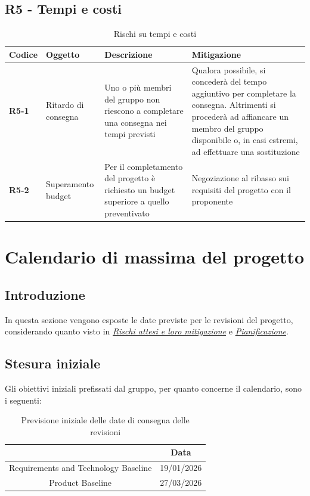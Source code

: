 \documentclass[a4paper,12pt]{article}
\begin{document}
    \subsection{R5 - Tempi e costi}
        \begin{table}[H]
        \label{tab:r5}
            \begin{tabularx}{\textwidth}{|l|L|L|L|}
            \hline
            \textbf{Codice} & \textbf{Oggetto} & \textbf{Descrizione} & \textbf{Mitigazione}\\
            \hline
            \textbf{R5-1} & Ritardo di consegna & Uno o più membri del gruppo non riescono a completare una consegna nei tempi previsti & Qualora possibile, si concederà del tempo aggiuntivo per completare la consegna. Altrimenti si procederà ad affiancare un membro del gruppo disponibile o, in casi estremi, ad effettuare una sostituzione\\
            \hline
            \textbf{R5-2} & Superamento budget & Per il completamento del progetto è richiesto un budget superiore a quello preventivato & Negoziazione al ribasso sui requisiti del progetto con il proponente \\
            \hline
            \end{tabularx}
            \caption{Rischi su tempi e costi}
        \end{table}

\newpage
\section{Calendario di massima del progetto}
    \subsection{Introduzione}
        In questa sezione vengono esposte le date previste per le revisioni del progetto, considerando quanto visto in \href{sec:rischi}{\textit{Rischi attesi e loro mitigazione}} e \href{sec:pianificazione}{\textit{Pianificazione}}.
    \subsection{Stesura iniziale}
        Gli obiettivi iniziali prefissati dal gruppo, per quanto concerne il calendario, sono i seguenti:
        \begin{table}[H]
            \centering
            \label{tab:cal1}
            \begin{tabular}{|c|c|}
            \hline
                \rowcolor{lightgray}{\textbf{Revisione}} & {\textbf{Data}}  \\
            \hline
                Requirements and Technology Baseline & 19/01/2026 \\
            \hline
                Product Baseline & 27/03/2026 \\
            \hline
            \end{tabular}
            \caption{Previsione iniziale delle date di consegna delle revisioni}
        \end{table}
\end{document}
